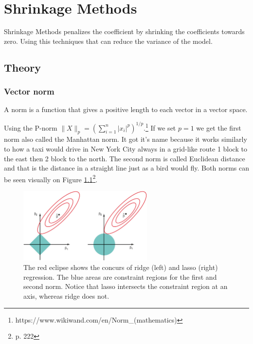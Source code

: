 \chapter{Shrinkage Methods} \label{ch:shrinkageMethods}
Shrinkage Methods penalizes the coefficient by shrinking the coefficients towards zero. Using this techniques that can reduce the variance of the model. 

\section{Theory}
\subsection{Vector norm}
A norm is a function that gives a positive length to each vector in a vector space.

\noindent Using the P-norm $\lVert X \rVert_p = (\sum_{i=1}^{n}|x_i|^p)^{1/p}$.\footnote{https://www.wikiwand.com/en/Norm\_(mathematics)} If we set $ p = 1 $ we get the first norm also called the Manhattan norm. It got it's name because it works similarly to how a taxi would drive in New York City always in a grid-like route 1 block to the east then 2 block to the north. The second norm is called Euclidean distance and that is the distance in a straight line just as a bird would fly. Both norms can be seen visually on Figure \ref{fig:normfirstsecond}\footnote{\cite{James2013} p. 222}.

\begin{figure}[H]
	\centering
	\includegraphics[width=0.6\textwidth]{shrinkageMethods/fig/normsL1_L2.jpg}
	\caption{The red eclipse shows the concurs of ridge (left) and lasso (right) regression. The blue areas are constraint regions for the first and second norm. Notice that lasso intersects the constraint region at an axis, whereas ridge does not.}
	\label{fig:normfirstsecond}
\end{figure}

